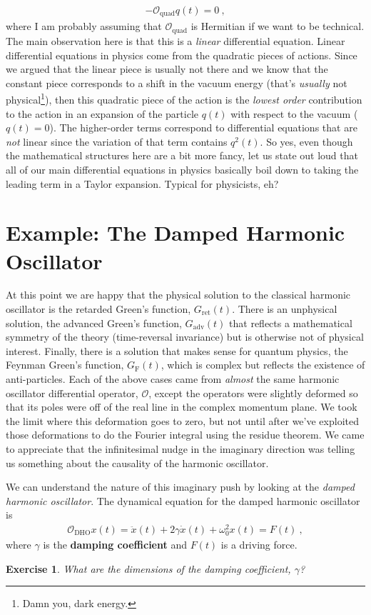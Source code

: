 \documentclass[
  11pt,
	colorful,
	raggedright,
]{tufte-style-thesis-flip}
\newtheorem{exercise}{Exercise}[section]
\begin{document}
\begin{align}
  -\mathcal O_\text{quad} q(t) = 0 \ ,
\end{align}
where I am probably assuming that $\mathcal O_\text{quad}$ is Hermitian if we want to be technical. The main observation here is that this is a \emph{linear} differential equation. Linear differential equations in physics come from the quadratic pieces of actions. Since we argued that the linear piece is usually not there and we know that the constant piece corresponds to a shift in the vacuum energy (that's \emph{usually} not physical\footnote{Damn you, dark energy.}), then this quadratic piece of the action is the \emph{lowest order} contribution to the action in an expansion of the particle $q(t)$ with respect to the vacuum ($q(t)=0$). The higher-order terms correspond to differential equations that are \emph{not} linear since the variation of that term contains $q^2(t)$. So yes, even though the mathematical structures here are a bit more fancy, let us state out loud that all of our main differential equations in physics basically boil down to taking the leading term in a Taylor expansion. Typical for physicists, eh?

\section{Example: The Damped Harmonic Oscillator}
 
 At this point we are happy that the physical solution to the classical harmonic oscillator is the retarded Green's function, $G_\text{ret}(t)$. There is an unphysical solution, the advanced Green's function, $G_\text{adv}(t)$ that reflects a mathematical symmetry of the theory (time-reversal invariance) but is otherwise not of physical interest. Finally, there is a solution that makes sense for quantum physics, the Feynman Green's function, $G_\text{F}(t)$, which is complex but reflects the existence of anti-particles. Each of the above cases came from \emph{almost} the same harmonic oscillator differential operator, $\mathcal O$, except the operators were slightly deformed so that its poles were off of the real line in the complex momentum plane. We took the limit where this deformation goes to zero, but not until after we've exploited those deformations to do the Fourier integral using the residue theorem. We came to appreciate that the infinitesimal nudge in the imaginary direction was telling us something about the causality of the harmonic oscillator.

 We can understand the nature of this imaginary push by looking at the \emph{damped harmonic oscillator}. The dynamical equation for the damped harmonic oscillator is
 \begin{align}
  \mathcal O_\text{DHO} x(t) = \ddot{x}(t) + 2\gamma\dot x(t) + \omega_0^2 x(t) = F(t) \ ,
 \end{align}
 where $\gamma$ is the \textbf{damping coefficient} and $F(t)$ is a driving force.
 \begin{exercise}
 What are the dimensions of the damping coefficient, $\gamma$?
 \end{exercise}
 
\end{document}
